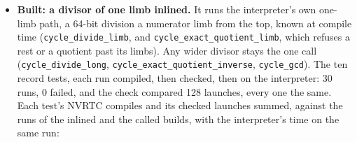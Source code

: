 \begin{enumerate}
\begin{itemize}
2,897 of the 2,904 division sites in those programs divide by one limb, and a call saves every live register around it. Copying the operands out retained the steps' own arrays in registers and was slower still. nvcc's fast compile (\texttt{-\allowbreak{}-\allowbreak{}Ofast-\allowbreak{}compile=mid}) built the 1,012-step program in 21.7 s, and its tower launches took 241.0 ms in one run (the interpreter's 409.7 ms).
\item \textbf{Built: a divisor of one limb inlined.} It runs the interpreter's own one-limb path, a 64-bit division a numerator limb from the top, known at compile time (\texttt{cycle\_\allowbreak{}divide\_\allowbreak{}limb}, and \texttt{cycle\_\allowbreak{}exact\_\allowbreak{}quotient\_\allowbreak{}limb}, which refuses a rest or a quotient past its limbs). Any wider divisor stays the one call (\texttt{cycle\_\allowbreak{}divide\_\allowbreak{}long}, \texttt{cycle\_\allowbreak{}exact\_\allowbreak{}quotient\_\allowbreak{}inverse}, \texttt{cycle\_\allowbreak{}gcd}). The ten record tests, each run compiled, then checked, then on the interpreter: 30 runs, 0 failed, and the check compared 128 launches, every one the same. Each test's NVRTC compiles and its checked launches summed, against the runs of the inlined and the called builds, with the interpreter's time on the same run:


\end{itemize}
\end{enumerate}
